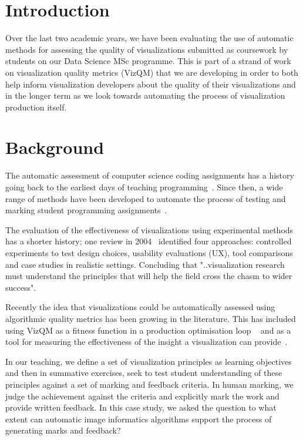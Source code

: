 \section{Introduction}

Over the last two academic years, we have been evaluating the use of automatic methods for assessing the quality of visualizations submitted as coursework by students on our Data Science MSc programme. This is part of a strand of work on visualization quality metrics (VizQM) that we are developing in order to both help inform visualization developers about the quality of their visualizations and in the longer term as we look towards automating the process of visualization production itself.

\section{Background}

The automatic assessment of computer science coding assignments has a history going back to the earliest days of teaching programming~\cite{Hollingsworth1960}. Since then, a wide range of methods have been developed to automate the process of testing and marking student programming assignments~\cite{Wilcox2015}.

The evaluation of the effectiveness of visualizations using experimental methods has a shorter history; one review in 2004~\cite{plaisant2004} identified four approaches: controlled experiments to test design choices, usability evaluations (UX), tool comparisons and case studies in realistic settings. Concluding that "..visualization research must understand the principles that will help the field cross the chasm to wider success".

Recently the idea that visualizations could be automatically assessed using algorithmic quality metrics has been growing in the literature. This has included using VizQM as a fitness function in a production optimisation loop ~\cite{House2006,Holliman2015,micallef2017} and as a tool for measuring the effectiveness of the insight a visualization can provide~\cite{North2006}.  

In our teaching, we define a set of visualization principles as learning objectives and then in summative exercises, seek to test student understanding of these principles against a set of marking and feedback criteria. In human marking, we judge the achievement against the criteria and explicitly mark the work and provide written feedback. In this case study, we asked the question to what extent can automatic image informatics algorithms support the process of generating marks and feedback?

